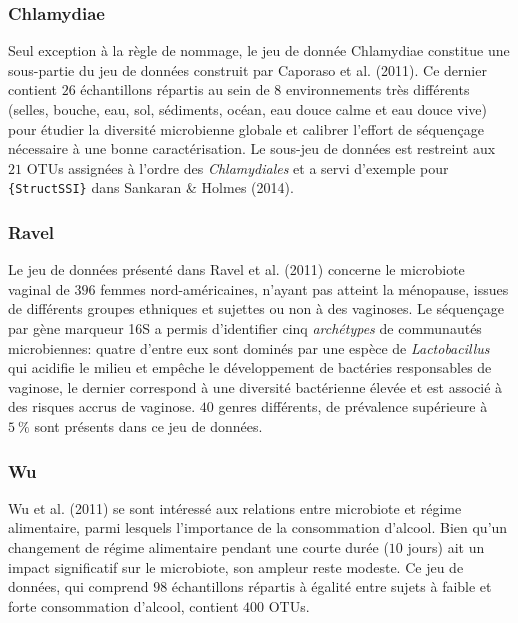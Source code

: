 \documentclass[12pt,a4paper]{reedthesis}
\theoremstyle{definition}
\theoremstyle{definition}
\theoremstyle{definition}
\theoremstyle{remark}
\begin{document}
\hypertarget{chlamydiae}{%
\subsubsection*{Chlamydiae}\label{chlamydiae}}

Seul exception à la règle de nommage, le jeu de donnée Chlamydiae constitue une sous-partie du jeu de données construit par Caporaso et al. (2011). Ce dernier contient \(26\) échantillons répartis au sein de \(8\) environnements très différents (selles, bouche, eau, sol, sédiments, océan, eau douce calme et eau douce vive) pour étudier la diversité microbienne globale et calibrer l'effort de séquençage nécessaire à une bonne caractérisation. Le sous-jeu de données est restreint aux \(21\) OTUs assignées à l'ordre des \emph{Chlamydiales} et a servi d'exemple pour \texttt{\{StructSSI\}} dans Sankaran \& Holmes (2014).

\hypertarget{ravel}{%
\subsubsection*{Ravel}\label{ravel}}

Le jeu de données présenté dans Ravel et al. (2011) concerne le microbiote vaginal de \(396\) femmes nord-américaines, n'ayant pas atteint la ménopause, issues de différents groupes ethniques et sujettes ou non à des vaginoses. Le séquençage par gène marqueur 16S a permis d'identifier cinq \emph{archétypes} de communautés microbiennes: quatre d'entre eux sont dominés par une espèce de \emph{Lactobacillus} qui acidifie le milieu et empêche le développement de bactéries responsables de vaginose, le dernier correspond à une diversité bactérienne élevée et est associé à des risques accrus de vaginose. \(40\) genres différents, de prévalence supérieure à \(5~\%\) sont présents dans ce jeu de données.

\hypertarget{wu}{%
\subsubsection*{Wu}\label{wu}}

Wu et al. (2011) se sont intéressé aux relations entre microbiote et régime alimentaire, parmi lesquels l'importance de la consommation d'alcool. Bien qu'un changement de régime alimentaire pendant une courte durée (\(10\) jours) ait un impact significatif sur le microbiote, son ampleur reste modeste. Ce jeu de données, qui comprend \(98\) échantillons répartis à égalité entre sujets à faible et forte consommation d'alcool, contient \(400\) OTUs.
\end{document}

